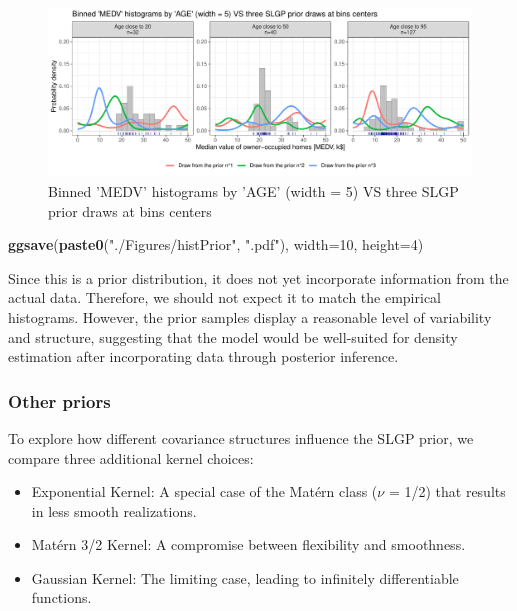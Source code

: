 \documentclass[
]{article}
\newenvironment{Shaded}{\begin{snugshade}}{\end{snugshade}}
\newcommand{\AttributeTok}[1]{\textcolor[rgb]{0.13,0.29,0.53}{#1}}
\newcommand{\DecValTok}[1]{\textcolor[rgb]{0.00,0.00,0.81}{#1}}
\newcommand{\FunctionTok}[1]{\textcolor[rgb]{0.13,0.29,0.53}{\textbf{#1}}}
\newcommand{\NormalTok}[1]{#1}
\newcommand{\StringTok}[1]{\textcolor[rgb]{0.31,0.60,0.02}{#1}}
\providecommand{\tightlist}{%
  \setlength{\itemsep}{0pt}\setlength{\parskip}{0pt}}
\begin{document}
\begin{figure}[H]

{\centering \includegraphics{IntroductionSLGP_files/figure-latex/SLGPplottingPrior2-1} 

}

\caption{Binned 'MEDV' histograms by 'AGE' (width = 5) VS three SLGP prior draws at bins centers}\label{fig:SLGPplottingPrior2}
\end{figure}

\begin{Shaded}
\begin{Highlighting}[]

\FunctionTok{ggsave}\NormalTok{(}\FunctionTok{paste0}\NormalTok{(}\StringTok{"./Figures/histPrior"}\NormalTok{,  }\StringTok{".pdf"}\NormalTok{), }\AttributeTok{width=}\DecValTok{10}\NormalTok{, }\AttributeTok{height=}\DecValTok{4}\NormalTok{)}
\end{Highlighting}
\end{Shaded}

Since this is a prior distribution, it does not yet incorporate information from the actual data. Therefore, we should not expect it to match the empirical histograms. However, the prior samples display a reasonable level of variability and structure, suggesting that the model would be well-suited for density estimation after incorporating data through posterior inference.

\subsubsection{Other priors}\label{other-priors}

To explore how different covariance structures influence the SLGP prior, we compare three additional kernel choices:

\begin{itemize}
\tightlist
\item
  Exponential Kernel: A special case of the Matérn class (\(\nu\) = 1/2) that results in less smooth realizations.
\item
  Matérn 3/2 Kernel: A compromise between flexibility and smoothness.
\item
  Gaussian Kernel: The limiting case, leading to infinitely differentiable functions.
\end{itemize}
\end{document}
